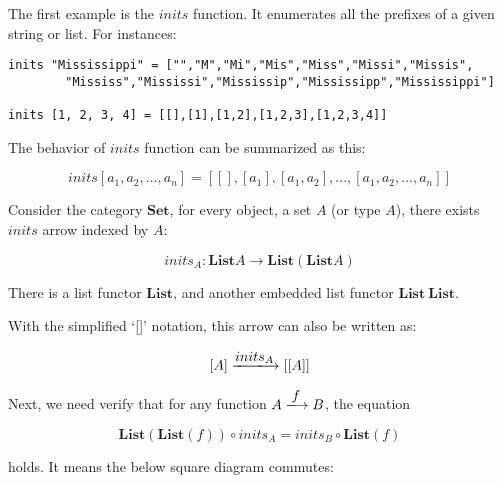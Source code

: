\documentclass{article}
\begin{document}
\begin{example}
\normalfont
The first example is the $inits$ function. It enumerates all the prefixes of a given string or list. For instances:

\lstset{frame=none}
\begin{lstlisting}
inits "Mississippi" = ["","M","Mi","Mis","Miss","Missi","Missis",
        "Mississ","Mississi","Mississip","Mississipp","Mississippi"]

inits [1, 2, 3, 4] = [[],[1],[1,2],[1,2,3],[1,2,3,4]]
\end{lstlisting}

The behavior of $inits$ function can be summarized as this:

\[
inits [a_1, a_2, ..., a_n] = [[], [a_1], [a_1, a_2], ..., [a_1, a_2, ..., a_n]]
\]

Consider the category $\pmb{Set}$, for every object, a set $A$ (or type $A$), there exists $inits$ arrow indexed by $A$:

\[
inits_A : \mathbf{List} A \to \mathbf{List}(\mathbf{List} A)
\]

There is a list functor $\mathbf{List}$, and another embedded list functor $\mathbf{List}\ \mathbf{List}$.

With the simplified `[]' notation, this arrow can also be written as:

\[
[A] \arrowto{inits_A} [[A]]
\]

Next, we need verify that for any function $A \arrowto{f} B$, the equation

\[
\mathbf{List}(\mathbf{List}(f)) \circ inits_A = inits_B \circ \mathbf{List}(f)
\]

holds. It means the below square diagram commutes:

\begin{center}
\end{center}


\end{example}
\end{document}
